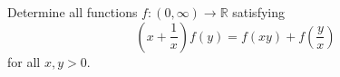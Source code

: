 Determine all functions $f: (0, \infty) \to \mathbb{R}$ satisfying
\[\left( x + \frac{1}{x} \right) f(y) = f(xy) + f\left(\frac{y}{x}\right)\]
for all $x, y > 0$.
